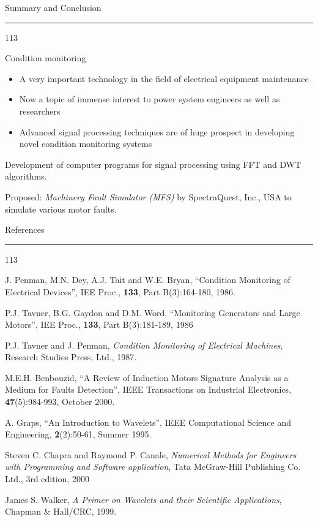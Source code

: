 \documentclass[a4,portrait,slidesonly]{seminar}
\begin{document}
\begin{slide*}
{\large \textsf{Summary and Conclusion}}\\
\hrule
\vspace{10pt}
\begin{dinglist} {113}
\item Condition monitoring
\begin{itemize}
\item A very important technology in the field of electrical equipment maintenance
\item Now a topic of immense interest to power system engineers as well as researchers

\item Advanced signal processing techniques are of huge prospect in developing novel condition monitoring systems
\end{itemize} 

\item Development of computer programs for signal processing using FFT and DWT algorithms.

\item Proposed: \emph{Machinery Fault Simulator (MFS)} by SpectraQuest, Inc., USA to simulate various motor faults.
\end{dinglist} 
\end{slide*}

\begin{slide*}
{\large \textsf{References}}\\
\hrule
\vspace{10pt}
\begin{dinglist} {113}
    \item J. Penman, M.N. Dey, A.J. Tait and W.E. Bryan, ``Condition Monitoring of Electrical Devices'', IEE Proc., \textbf{133}, Part B(3):164-180, 1986.
    \item P.J. Tavner, B.G. Gaydon and D.M. Word, ``Monitoring Generators and Large Motors'', IEE Proc., \textbf{133}, Part B(3):181-189, 1986
    \item P.J. Tavner and J. Penman, \emph{Condition Monitoring of Electrical Machines}, Research Studies Press, Ltd., 1987.
    \item M.E.H. Benbouzid, ``A Review of Induction Motors Signature Analysis as a Medium  for  Faults  Detection'',  IEEE  Transactions on Industrial Electronics, \textbf{47}(5):984-993, October 2000.
    \item A. Graps, ``An Introduction to Wavelets'', IEEE Computational Science and Engineering, \textbf{2}(2):50-61, Summer 1995.
    \item Steven C. Chapra and Raymond P. Canale, \emph{Numerical Methods for Engineers with Programming and Software application}, Tata McGraw-Hill Publishing Co. Ltd., 3rd edition, 2000
    \item James S. Walker, \emph{A Primer on Wavelets and their Scientific Applications}, Chapman \& Hall/CRC, 1999.
\end{dinglist}
\end{slide*}
\end{document}
